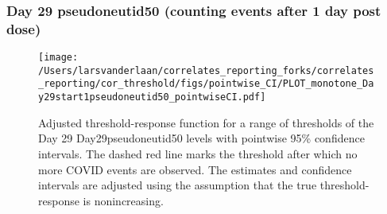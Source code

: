 \documentclass[]{article}
\begin{document}
\clearpage
\clearpage

\clearpage

\hypertarget{day-29-pseudoneutid50-counting-events-after-1-day-post-dose}{%
\subsubsection{Day 29 pseudoneutid50 (counting events after 1 day post
dose)}\label{day-29-pseudoneutid50-counting-events-after-1-day-post-dose}}

\begin{figure}[H]
\centering
\texttt{[image: /Users/larsvanderlaan/correlates\_reporting\_forks/correlates\_reporting/cor\_threshold/figs/pointwise\_CI/PLOT\_monotone\_Day29start1pseudoneutid50\_pointwiseCI.pdf]}
\caption{Adjusted threshold-response function for a range of thresholds of the
  Day 29 Day29pseudoneutid50 levels with pointwise 95\% confidence intervals. The dashed red line marks the threshold after which no more COVID events are observed. The estimates and confidence intervals are adjusted using the assumption that the true threshold-response is nonincreasing.}
\end{figure}
\end{document}
